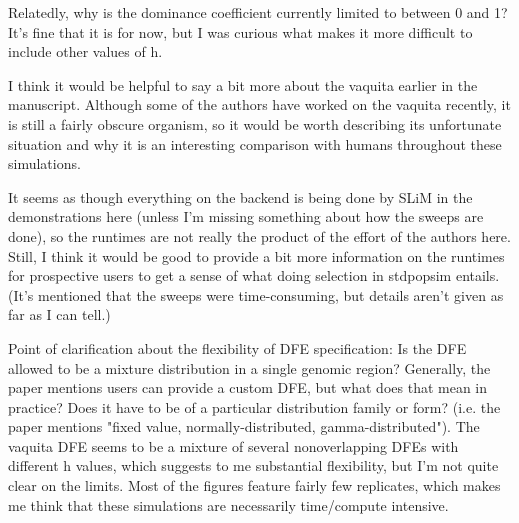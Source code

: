   
  \begin{point}{\revref} 
    Relatedly, why is the dominance coefficient currently limited to between 0 and 1? It's fine that it is for now, but I was curious what makes it more difficult to include other values of h.
  \end{point}
  
  
  \begin{point}{} 
    I think it would be helpful to say a bit more about the vaquita earlier in the manuscript. Although some of the authors have worked on the vaquita recently, it is still a fairly obscure organism, 
    so it would be worth describing its unfortunate situation and why it is an interesting comparison with humans throughout these simulations.  
\end{point}
  
  
  \begin{point}{} %
    It seems as though everything on the backend is being done by SLiM in the demonstrations here 
    (unless I'm missing something about how the sweeps are done), so the runtimes are not really the product of the effort of the authors here. 
    Still, I think it would be good to provide a bit more information on the runtimes for prospective users to get a sense of what doing selection in stdpopsim entails. 
    (It's mentioned that the sweeps were time-consuming, but details aren't given as far as I can tell.)  
\end{point}
  
  
  \begin{point}{} %
    Point of clarification about the flexibility of DFE specification: Is the DFE allowed to be a mixture distribution in a single genomic region? 
    Generally, the paper mentions users can provide a custom DFE, but what does that mean in practice? Does it have to be of a particular distribution family or form? 
    (i.e. the paper mentions "fixed value, normally-distributed, gamma-distributed"). 
    The vaquita DFE seems to be a mixture of several nonoverlapping DFEs with different h values, which suggests to me substantial flexibility, 
    but I'm not quite clear on the limits. Most of the figures feature fairly few replicates, which makes me think that these simulations are necessarily time/compute intensive.
  \end{point}
  
